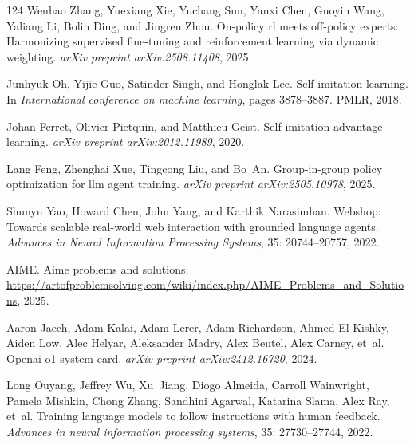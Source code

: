 \documentclass[]{youtu} %
\begin{document}
\begin{thebibliography}{124}
Wenhao Zhang, Yuexiang Xie, Yuchang Sun, Yanxi Chen, Guoyin Wang, Yaliang Li, Bolin Ding, and Jingren Zhou.
\newblock On-policy rl meets off-policy experts: Harmonizing supervised fine-tuning and reinforcement learning via dynamic weighting.
\newblock \emph{arXiv preprint arXiv:2508.11408}, 2025{}.

Junhyuk Oh, Yijie Guo, Satinder Singh, and Honglak Lee.
\newblock Self-imitation learning.
\newblock In \emph{International conference on machine learning}, pages 3878--3887. PMLR, 2018.

Johan Ferret, Olivier Pietquin, and Matthieu Geist.
\newblock Self-imitation advantage learning.
\newblock \emph{arXiv preprint arXiv:2012.11989}, 2020.

Lang Feng, Zhenghai Xue, Tingcong Liu, and Bo~An.
\newblock Group-in-group policy optimization for llm agent training.
\newblock \emph{arXiv preprint arXiv:2505.10978}, 2025{}.

Shunyu Yao, Howard Chen, John Yang, and Karthik Narasimhan.
\newblock Webshop: Towards scalable real-world web interaction with grounded language agents.
\newblock \emph{Advances in Neural Information Processing Systems}, 35: 20744--20757, 2022.

AIME.
\newblock Aime problems and solutions.
\newblock \url{https://artofproblemsolving.com/wiki/index.php/AIME_Problems_and_Solutions}, 2025.

Aaron Jaech, Adam Kalai, Adam Lerer, Adam Richardson, Ahmed El-Kishky, Aiden Low, Alec Helyar, Aleksander Madry, Alex Beutel, Alex Carney, et~al.
\newblock Openai o1 system card.
\newblock \emph{arXiv preprint arXiv:2412.16720}, 2024.

Long Ouyang, Jeffrey Wu, Xu~Jiang, Diogo Almeida, Carroll Wainwright, Pamela Mishkin, Chong Zhang, Sandhini Agarwal, Katarina Slama, Alex Ray, et~al.
\newblock Training language models to follow instructions with human feedback.
\newblock \emph{Advances in neural information processing systems}, 35: 27730--27744, 2022.


\end{thebibliography}
\end{document}

